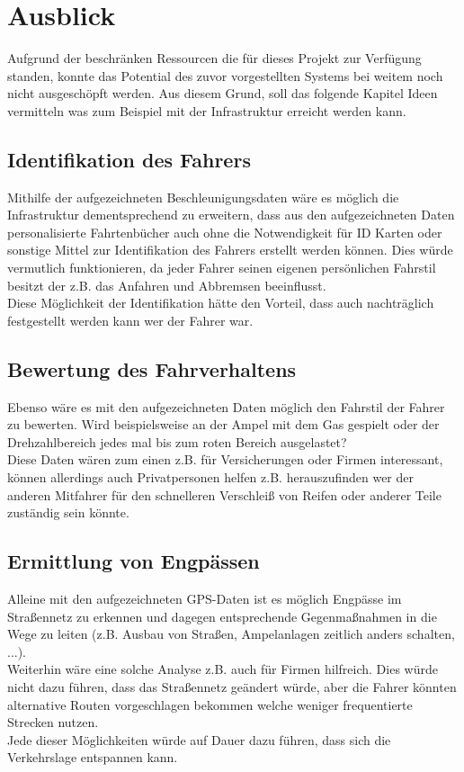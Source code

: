 \chapter{Ausblick}
Aufgrund der beschränken Ressourcen die für dieses Projekt zur Verfügung standen, konnte das Potential des zuvor vorgestellten Systems bei weitem noch nicht ausgeschöpft werden. Aus diesem Grund, soll das folgende Kapitel Ideen vermitteln was zum Beispiel mit der Infrastruktur erreicht werden kann.

\section{Identifikation des Fahrers}
Mithilfe der aufgezeichneten Beschleunigungsdaten wäre es möglich die Infrastruktur dementsprechend zu erweitern, dass aus den aufgezeichneten Daten personalisierte Fahrtenbücher auch ohne die Notwendigkeit für ID Karten oder sonstige Mittel zur Identifikation des Fahrers erstellt werden können. Dies würde vermutlich funktionieren, da jeder Fahrer seinen eigenen persönlichen Fahrstil besitzt der z.B. das Anfahren und Abbremsen beeinflusst. 
\\
Diese Möglichkeit der Identifikation hätte den Vorteil, dass auch nachträglich festgestellt werden kann wer der Fahrer war.

\section{Bewertung des Fahrverhaltens}
Ebenso wäre es mit den aufgezeichneten Daten möglich den Fahrstil der Fahrer zu bewerten. Wird beispielsweise an der Ampel mit dem Gas gespielt oder der Drehzahlbereich jedes mal bis zum roten Bereich ausgelastet?
\\
Diese Daten wären zum einen z.B. für Versicherungen oder Firmen interessant, können allerdings auch Privatpersonen helfen z.B. herauszufinden wer der anderen Mitfahrer für den schnelleren Verschleiß von Reifen oder anderer Teile zuständig sein könnte.

\section{Ermittlung von Engpässen}
\label{SecErmittlungVonEngpaessen}
Alleine mit den aufgezeichneten GPS-Daten ist es möglich Engpässe im Straßennetz zu erkennen und dagegen entsprechende Gegenmaßnahmen in die Wege zu leiten (z.B. Ausbau von Straßen, Ampelanlagen zeitlich anders schalten, ...). 
\\
Weiterhin wäre eine solche Analyse z.B. auch für Firmen hilfreich. Dies würde nicht dazu führen, dass das Straßennetz geändert würde, aber die Fahrer könnten alternative Routen vorgeschlagen bekommen welche weniger frequentierte Strecken nutzen.
\\
Jede dieser Möglichkeiten würde auf Dauer dazu führen, dass sich die Verkehrslage entspannen kann.

